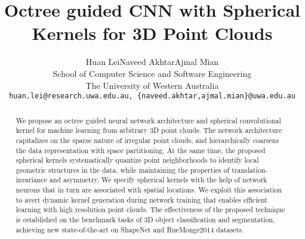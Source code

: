 \documentclass[10pt,twocolumn,letterpaper]{article}
\begin{document}
\title{Octree guided CNN with Spherical Kernels for 3D Point Clouds}
\author{Huan Lei\hspace{6mm}Naveed Akhtar\hspace{6mm}Ajmal Mian\\
School of Computer Science and Software Engineering\\
The University of Western Australia\\
{\tt\small huan.lei@research.uwa.edu.au, \{naveed.akhtar,ajmal.mian\}@uwa.edu.au}
}

\maketitle


\begin{abstract}
\vspace{-3mm}
   We propose an octree guided neural network architecture and spherical convolutional kernel for machine learning from arbitrary 3D point clouds. The network architecture capitalizes on the sparse nature of irregular point clouds, and hierarchically coarsens the data  representation with space partitioning. At the same time, the proposed  spherical kernels systematically quantize point neighborhoods to identify local geometric structures in the data, while maintaining the properties of translation-invariance and asymmetry. We specify spherical kernels with the help of network neurons that in turn are associated with spatial locations. We exploit this association to avert dynamic kernel generation during network training that enables efficient learning with high resolution point clouds. The effectiveness of the proposed technique is established on the benchmark tasks of 3D object classification and segmentation, achieving new state-of-the-art on ShapeNet and RueMonge2014 datasets. 
   
\end{abstract}

\vspace{-5mm}
\end{document}
